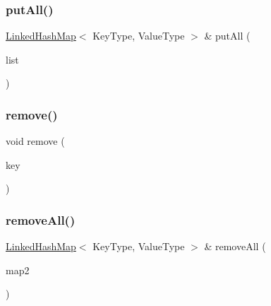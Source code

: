 \mbox{\label{classLinkedHashMap_a8cb591b953a8e479b178b4ed111f39e8}} 
\subsubsection{\texorpdfstring{put\+All()}{putAll()}\hspace{0.1cm}{\footnotesize\ttfamily [2/2]}}
{\footnotesize\ttfamily \mbox{\hyperlink{classLinkedHashMap}{Linked\+Hash\+Map}}$<$ Key\+Type, Value\+Type $>$ \& put\+All (\begin{DoxyParamCaption}\item[{std\+::initializer\+\_\+list$<$ std\+::pair$<$ Key\+Type, Value\+Type $>$ $>$}]{list }\end{DoxyParamCaption})}

\mbox{\label{classLinkedHashMap_ac6e7e5198a9f1c8b2cc40fbd1d0eb3b0}} 
\subsubsection{\texorpdfstring{remove()}{remove()}}
{\footnotesize\ttfamily void remove (\begin{DoxyParamCaption}\item[{const Key\+Type \&}]{key }\end{DoxyParamCaption})}

\mbox{\label{classLinkedHashMap_a192b64f541a02885811d43505ac99d6f}} 
\subsubsection{\texorpdfstring{remove\+All()}{removeAll()}\hspace{0.1cm}{\footnotesize\ttfamily [1/2]}}
{\footnotesize\ttfamily \mbox{\hyperlink{classLinkedHashMap}{Linked\+Hash\+Map}}$<$ Key\+Type, Value\+Type $>$ \& remove\+All (\begin{DoxyParamCaption}\item[{const \mbox{\hyperlink{classLinkedHashMap}{Linked\+Hash\+Map}}$<$ Key\+Type, Value\+Type $>$ \&}]{map2 }\end{DoxyParamCaption})}

